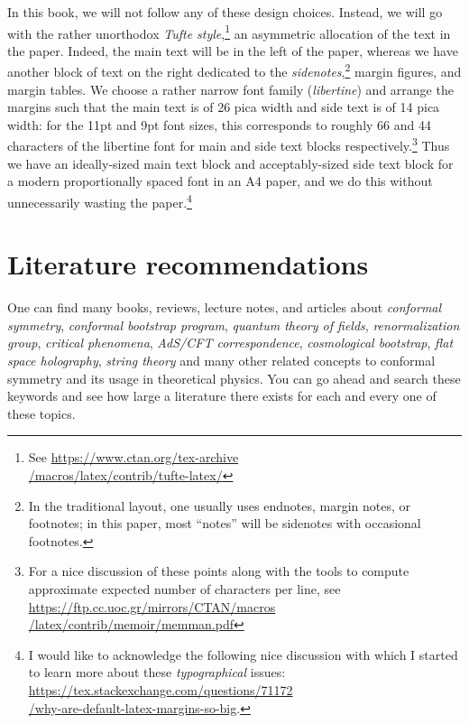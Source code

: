 \hphantom{\indent} In this book, we will not follow any of these design choices. Instead, we will go with the rather unorthodox \emph{Tufte style},\footnote{See \href{https://www.ctan.org/tex-archive/macros/latex/contrib/tufte-latex/}{https://www.ctan.org/tex-archive\\/macros/latex/contrib/tufte-latex/}} an asymmetric allocation of the text in the paper. Indeed, the main text will be in the left of the paper, whereas we have another block of text on the right dedicated to the \emph{sidenotes},\footnote{In the traditional layout, one usually uses endnotes, margin notes, or footnotes; in this paper, most ``notes'' will be sidenotes with occasional footnotes.\bottomnotemark} margin figures, and margin tables. We choose a rather narrow font family (\emph{libertine}) and arrange the margins such that the main text is of 26 pica width and side text is of 14 pica width: for the 11pt and 9pt font sizes, this corresponds to roughly 66 and 44 characters of the libertine font for main and side text blocks respectively.\footnote{For a nice discussion of these points along with the tools to compute approximate expected number of characters per line, see \href{https://ftp.cc.uoc.gr/mirrors/CTAN/macros/latex/contrib/memoir/memman.pdf}{https://ftp.cc.uoc.gr/mirrors/CTAN/macros\\/latex/contrib/memoir/memman.pdf}} Thus we have an ideally-sized main text block and acceptably-sized side text block for a modern proportionally spaced font in an A4 paper, and we do this without unnecessarily wasting the paper.\footnote{I would like to acknowledge the following nice discussion with which I started to learn more about these \emph{typographical} issues: \href{https://tex.stackexchange.com/questions/71172/why-are-default-latex-margins-so-big}{https://tex.stackexchange.com/questions/71172\\/why-are-default-latex-margins-so-big}.}

\section{Literature recommendations}
One can find many books, reviews, lecture notes, and articles about \emph{conformal symmetry}, \emph{conformal bootstrap program}, \emph{quantum theory of fields}, \emph{renormalization group}, \emph{critical phenomena}, \emph{AdS/CFT correspondence}, \emph{cosmological bootstrap}, \emph{flat space holography}, \emph{string theory} and many other related concepts to conformal symmetry and its usage in theoretical physics. You can go ahead and search these keywords and see how large a literature there exists for each and every one of these topics.


